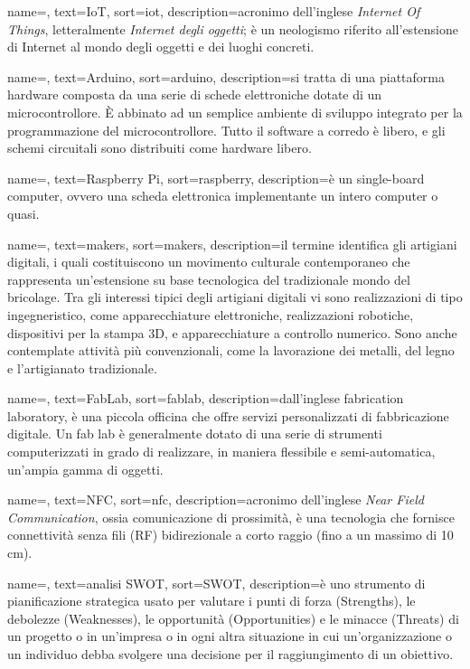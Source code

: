 {
	name=,
    text=IoT,
    sort=iot,
    description={acronimo dell'inglese \textit{Internet Of Things}, letteralmente \textit{Internet degli oggetti}; è un neologismo riferito all'estensione di Internet al mondo degli oggetti e dei luoghi concreti.}
}

{
	name=,
    text=Arduino,
    sort=arduino,
    description={si tratta di una piattaforma hardware composta da una serie di schede elettroniche dotate di un microcontrollore. È abbinato ad un semplice ambiente di sviluppo integrato per la programmazione del microcontrollore. Tutto il software a corredo è libero, e gli schemi circuitali sono distribuiti come hardware libero.}
}

{
	name=,
    text=Raspberry Pi,
    sort=raspberry,
    description={è un single-board computer, ovvero una scheda elettronica implementante un intero computer o quasi.}
}

{
	name=,
    text=makers,
    sort=makers,
    description={il termine identifica gli artigiani digitali, i quali costituiscono un movimento culturale contemporaneo che rappresenta un'estensione su base tecnologica del tradizionale mondo del bricolage. Tra gli interessi tipici degli artigiani digitali vi sono realizzazioni di tipo ingegneristico, come apparecchiature elettroniche, realizzazioni robotiche, dispositivi per la stampa 3D, e apparecchiature a controllo numerico. Sono anche contemplate attività più convenzionali, come la lavorazione dei metalli, del legno e l'artigianato tradizionale.}
}

{
	name=,
    text=FabLab,
    sort=fablab,
    description={dall'inglese fabrication laboratory, è una piccola officina che offre servizi personalizzati di fabbricazione digitale. Un fab lab è generalmente dotato di una serie di strumenti computerizzati in grado di realizzare, in maniera flessibile e semi-automatica, un'ampia gamma di oggetti.}
}

{
	name=,
    text=NFC,
    sort=nfc,
    description={acronimo dell'inglese \textit{Near Field Communication}, ossia comunicazione di prossimità, è una tecnologia che fornisce connettività senza fili (RF) bidirezionale a corto raggio (fino a un massimo di 10 cm).}
}

{
	name=,
    text=analisi SWOT,
    sort=SWOT,
    description={è uno strumento di pianificazione strategica usato per valutare i punti di forza (Strengths), le debolezze (Weaknesses), le opportunità (Opportunities) e le minacce (Threats) di un progetto o in un'impresa o in ogni altra situazione in cui un'organizzazione o un individuo debba svolgere una decisione per il raggiungimento di un obiettivo.}
}


